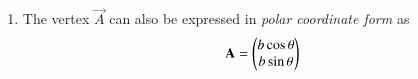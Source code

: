 \begin{enumerate}[label=\arabic*.,ref=\thesubsection.\theenumi]
\solution The vertices of $\triangle ABC$ are 
\begin{align}
\vec{A} = \myvec{a\\c} = \myvec{4\\3}, \vec{B} = \myvec{a\\0}  = \myvec{4\\0}, \vec{C} = \myvec{0\\0}.
\end{align}
%
The python code for  Fig. \ref{fig:tri_polar} is
\begin{lstlisting}
codes/triangle/tri_polar.py
\end{lstlisting}
%
and the equivalent latex-tikz code is
%
\begin{lstlisting}
figs/triangle/tri_polar.tex
\end{lstlisting}
\begin{figure}[!ht]
\centering
\resizebox{\columnwidth}{!}{}
\caption{Right Angled Triangle}
\label{fig:tri_polar}	
\end{figure}
%
\item The vertex  $\vec{A}$ can also be expressed  in {\em polar coordinate form} as
\label{prob:tri_polar}
%
\begin{align}
\mathbf{A} = \begin{pmatrix}b\cos \theta\\ b \sin \theta\end{pmatrix} 
\end{align}
%

\end{enumerate}

